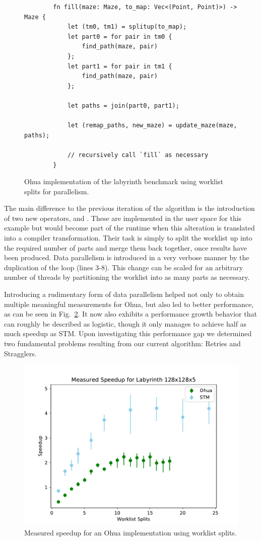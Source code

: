 \begin{figure}[t]
    \begin{verbatim}
        fn fill(maze: Maze, to_map: Vec<(Point, Point)>) -> Maze {
            let (tm0, tm1) = splitup(to_map);
            let part0 = for pair in tm0 {
                find_path(maze, pair)
            };
            let part1 = for pair in tm1 {
                find_path(maze, pair)
            };

            let paths = join(part0, part1);

            let (remap_paths, new_maze) = update_maze(maze, paths);

            // recursively call `fill` as necessary
        }
    \end{verbatim}
    \caption{Ohua implementation of the labyrinth benchmark using worklist splits for parallelism.}%
    \label{fig:preliminaries:ohua2}
\end{figure}

The main difference to the previous iteration of the algorithm is the introduction of two new operators,  and .
These are implemented in the user space for this example but would become part of the runtime when this alteration is translated into a compiler transformation.
Their task is simply to split the worklist up into the required number of parts and merge them back together, once results have been produced.
Data parallelism is introduced in a very verbose manner by the duplication of the loop (lines 3-8).
This change can be scaled for an arbitrary number of threads by partitioning the worklist into as many parts as necessary.

Introducing a rudimentary form of data parallelism helped not only to obtain multiple meaningful measurements for Ohua, but also led to better performance, as can be seen in Fig.~\ref{fig:preliminaries:split-results}.
It now also exhibits a performance growth behavior that can roughly be described as logistic, though it only manages to achieve half as much speedup as STM.
Upon investigating this performance gap we determined two fundamental problems resulting from our current algorithm: Retries and Stragglers.

\begin{figure}[h]
    \centering
    \includegraphics[width=.5\textwidth,keepaspectratio]{gfx/preliminaries-labyrinth/split_128x128x5}
    \caption{Measured speedup for an Ohua implementation using worklist splits.}%
    \label{fig:preliminaries:split-results}
\end{figure}

